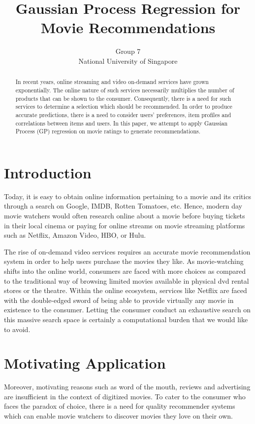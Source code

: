 \documentclass[letterpaper]{article}
\begin{document}
%
\title{Gaussian Process Regression for Movie Recommendations}
\author{Group 7\\
National University of Singapore
}
\maketitle
\begin{abstract}
In recent years, online streaming and video on-demand services have grown exponentially. The online nature of such services necessarily multiplies the number of products that can be shown to the consumer. Consequently, there is a need for such services to determine a selection which should be recommended. In order to produce accurate predictions, there is a need to consider users' preferences, item profiles and correlations between items and users. In this paper, we attempt to apply Gaussian Process (GP) regression on movie ratings to generate recommendations.
\end{abstract}

\section{Introduction}
\noindent Today, it is easy to obtain online information pertaining to a movie and its critics through a search on Google, IMDB, Rotten Tomatoes, etc. Hence, modern day movie watchers would often research online about a movie before buying tickets in their local cinema or paying for online streams on movie streaming platforms such as Netflix, Amazon Video, HBO, or Hulu.

The rise of on-demand video services requires an accurate movie recommendation system in order to help users purchase the movies they like. As movie-watching shifts into the online world, consumers are faced with more choices as compared to the traditional way of browsing limited movies available in physical dvd rental stores or the theatre. Within the online ecosystem, services like Netflix are faced with the double-edged sword of being able to provide virtually any movie in existence to the consumer. Letting the consumer conduct an exhaustive search on this massive search space is certainly a computational burden that we would like to avoid.

\section{Motivating Application}
Moreover, motivating reasons such as word of the mouth, reviews and advertising are insufficient in the context of digitized movies. To cater to the consumer who faces the paradox of choice, there is a need for quality recommender systems which can enable movie watchers to discover movies they love on their own.
\end{document}
